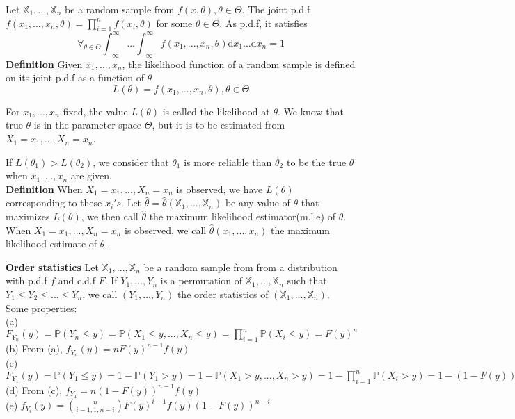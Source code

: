 Let $\mathbb{X}_1, ..., \mathbb{X}_n$ be a random sample from $f(x, \theta), \theta \in \Theta$. The joint p.d.f $f(x_1, ..., x_n, \theta) = \prod_{i=1}^n f(x_i, \theta)$ for some $\theta \in \Theta$. As p.d.f, it satisfies
$$\forall_{\theta \in \Theta }\int_{-\infty}^\infty ... \int_{-\infty}^\infty f(x_1, ..., x_n, \theta) \mathrm{d}x_1 ... \mathrm{d}x_n = 1$$
\textbf{Definition} Given $x_1, ..., x_n$, the likelihood function of a random sample is defined on its joint p.d.f as a function of $\theta$
$$L(\theta) = f(x_1, ..., x_n, \theta), \theta \in \Theta$$

For $x_1, ..., x_n$ fixed, the value $L(\theta)$ is called the likelihood at $\theta$. We know that true $\theta$ is in the parameter space $\Theta$, but it is to be estimated from $X_1 = x_1, ..., X_n = x_n$.

If $L(\theta_1) > L(\theta_2)$, we consider that $\theta_1$ is more reliable than $\theta_2$ to be the true $\theta$ when $x_1, ..., x_n$ are given.\\

\textbf{Definition} When $X_1 = x_1, ..., X_n = x_n$ is observed, we have $L(\theta)$ corresponding to these $x_i's$. Let $\hat{\theta} = \hat{\theta}(\mathbb{X}_1, ..., \mathbb{X}_n)$ be any value of $\theta$ that maximizes $L(\theta)$, we then call $\hat{\theta}$ the maximum likelihood estimator(m.l.e) of $\theta$. When $X_1 = x_1, ..., X_n = x_n$ is observed, we call $\hat{\theta}(x_1, ..., x_n)$ the maximum likelihood estimate of $\theta$.

\textbf{Order statistics}
Let $\mathbb{X}_1, ..., \mathbb{X}_n$ be a random sample from from a distribution with p.d.f $f$ and c.d.f $F$. If $Y_1, ..., Y_n$ is a permutation of $\mathbb{X}_1, ..., \mathbb{X}_n$ such that $Y_1 \leq Y_2 \leq ... \leq Y_n$, we call $(Y_1, ..., Y_n)$ the order statistics of $(\mathbb{X}_1, ..., \mathbb{X}_n)$.\\

Some properties:\\
(a) $F_{Y_n}(y) = \mathbb{P}( Y_n \leq y ) = \mathbb{P}(X_1 \leq y, ..., X_n \leq y) = \prod_{i=1}^n \mathbb{P}(X_i \leq y) = F(y)^n$\\
(b) From (a), $f_{Y_n} (y) = n F(y)^{n-1}f(y)$\\
(c) $F_{Y_1}(y) = \mathbb{P}( Y_1 \leq y ) = 1-\mathbb{P}( Y_1 > y ) = 1-\mathbb{P}(X_1 > y, ..., X_n > y) = 1-\prod_{i=1}^n \mathbb{P}(X_i > y) = 1-(1-F(y))^n$\\
(d) From (c), $f_{Y_1} = n(1-F(y))^{n-1}f(y)$\\
(e) $f_{Y_i}(y) = {n \choose i-1, 1, n-i} F(y)^{i-1}f(y)(1-F(y))^{n-i}$\\


